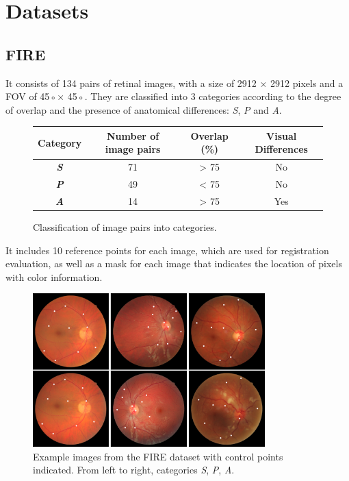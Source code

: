 \section{Datasets}
\label{sec:Datasets}

\subsection{FIRE}
\label{subsec:FIRE}

It consists of 134 pairs of retinal images, with a size of 2912 × 2912 pixels and a \gls{FOV} of 45◦× 45◦.
They are classified into 3 categories according to the degree of overlap and the presence of anatomical differences: \textit{S}, \textit{P} and \textit{A}. \cite{FIRE}

\begin{figure}[tbp]
    \centering
    \setlength{\tabcolsep}{8pt} %
    \begin{tabular}{|c|c|c|c|}
        \hline
        \textbf{Category} & \textbf{Number of image pairs} & \textbf{Overlap (\%)} & \textbf{Visual Differences} \\
        \hline
        \textbf{\textit{\textsf{S}}} & 71 & > 75 & No \\
        \hline
        \textbf{\textit{\textsf{P}}} & 49 & < 75 & No \\
        \hline
        \textbf{\textit{\textsf{A}}} & 14 & > 75 & Yes \\
        \hline
    \end{tabular}
    \caption{Classification of image pairs into categories.}
    \label{tab:categorias}
\end{figure}
\FloatBarrier

It includes 10 reference points for each image, which are used for registration evaluation, as well as a mask for each image that indicates the location of pixels with color information.

\begin{figure}[tbp]
    \centering
    \includegraphics[width=0.8\textwidth]{imaxes/fire-ej.png}
    \caption{Example images from the FIRE dataset \cite{FIRE} with control points indicated. From left to right, categories \textit{\textsf{S}}, \textit{\textsf{P}}, \textit{\textsf{A}}.}
    \label{fig:fire_ej}
\end{figure}

